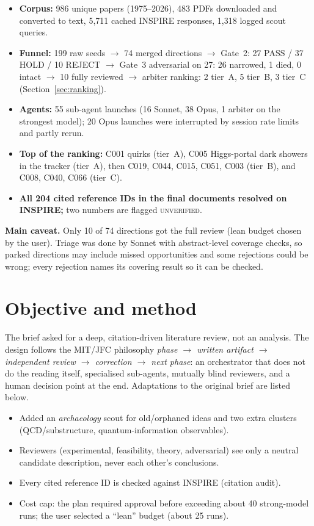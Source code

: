 \documentclass[11pt,a4paper]{article}
\begin{document}
\begin{itemize}
\item \textbf{Corpus:} 986 unique papers (1975--2026), 483 PDFs downloaded and converted to text, 5,711 cached INSPIRE responses, 1,318 logged scout queries.
\item \textbf{Funnel:} 199 raw seeds $\to$ 74 merged directions $\to$ Gate~2: 27 PASS / 37 HOLD / 10 REJECT $\to$ Gate~3 adversarial on 27: 26 narrowed, 1 died, 0 intact $\to$ 10 fully reviewed $\to$ arbiter ranking: 2 tier~A, 5 tier~B, 3 tier~C (Section~\ref{sec:ranking}).
\item \textbf{Agents:} 55 sub-agent launches (16 Sonnet, 38 Opus, 1 arbiter on the strongest model); 20 Opus launches were interrupted by session rate limits and partly rerun.
\item \textbf{Top of the ranking:} C001 quirks (tier~A), C005 Higgs-portal dark showers in the tracker (tier~A), then C019, C044, C015, C051, C003 (tier~B), and C008, C040, C066 (tier~C).
\item \textbf{All 204 cited reference IDs in the final documents resolved on INSPIRE;} two numbers are flagged \textsc{unverified}.
\end{itemize}
\begin{caution}\textbf{Main caveat.} Only 10 of 74 directions got the full review (lean budget chosen by the user). Triage was done by Sonnet with abstract-level coverage checks, so parked directions may include missed opportunities and some rejections could be wrong; every rejection names its covering result so it can be checked.\end{caution}

\section{Objective and method}
The brief asked for a deep, citation-driven literature review, not an analysis. The design follows the MIT/JFC philosophy \emph{phase $\to$ written artifact $\to$ independent review $\to$ correction $\to$ next phase}: an orchestrator that does not do the reading itself, specialised sub-agents, mutually blind reviewers, and a human decision point at the end. Adaptations to the original brief are listed below.
\begin{itemize}
\item Added an \emph{archaeology} scout for old/orphaned ideas and two extra clusters (QCD/substructure, quantum-information observables).
\item Reviewers (experimental, feasibility, theory, adversarial) see only a neutral candidate description, never each other's conclusions.
\item Every cited reference ID is checked against INSPIRE (citation audit).
\item Cost cap: the plan required approval before exceeding about 40 strong-model runs; the user selected a ``lean'' budget (about 25 runs).
\end{itemize}
\end{document}
